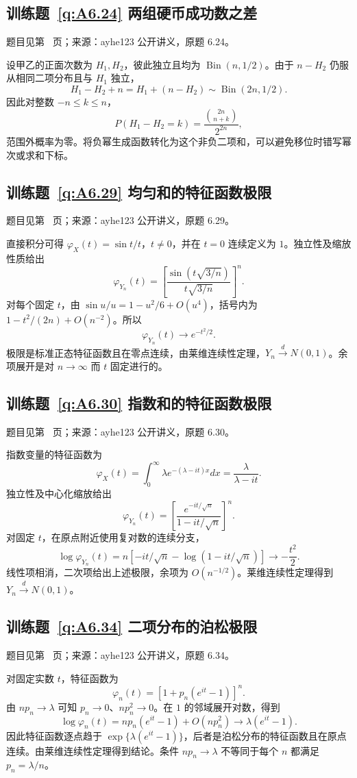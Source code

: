 \documentclass[UTF8,12pt,a4paper,fontset=fandol]{ctexbook}
\begin{document}
\subsection*{训练题~\ref{q:A6.24} 两组硬币成功数之差}\label{a:A6.24}{\small 题目见第~\pageref{q:A6.24} 页；来源：ayhe123 公开讲义，原题 6.24。}
\begin{solve}设甲乙的正面次数为 $H_1,H_2$，彼此独立且均为 $\operatorname{Bin}(n,1/2)$。由于 $n-H_2$ 仍服从相同二项分布且与 $H_1$ 独立，\[H_1-H_2+n=H_1+(n-H_2)\sim\operatorname{Bin}(2n,1/2).\]因此对整数 $-n\le k\le n$，\[P(H_1-H_2=k)=\frac{\binom{2n}{n+k}}{2^{2n}},\]范围外概率为零。将负幂生成函数转化为这个非负二项和，可以避免移位时错写幂次或求和下标。\end{solve}

\subsection*{训练题~\ref{q:A6.29} 均匀和的特征函数极限}\label{a:A6.29}{\small 题目见第~\pageref{q:A6.29} 页；来源：ayhe123 公开讲义，原题 6.29。}
\begin{solve}直接积分可得 $\varphi_X(t)=\sin t/t$，$t\ne0$，并在 $t=0$ 连续定义为 $1$。独立性及缩放性质给出\[\varphi_{Y_n}(t)=\left[\frac{\sin(t\sqrt{3/n})}{t\sqrt{3/n}}\right]^n.\]对每个固定 $t$，由 $\sin u/u=1-u^2/6+O(u^4)$，括号内为 $1-t^2/(2n)+O(n^{-2})$。所以\[\varphi_{Y_n}(t)\to e^{-t^2/2}.\]极限是标准正态特征函数且在零点连续，由莱维连续性定理，$Y_n\xrightarrow dN(0,1)$。余项展开是对 $n\to\infty$ 而 $t$ 固定进行的。\end{solve}

\subsection*{训练题~\ref{q:A6.30} 指数和的特征函数极限}\label{a:A6.30}{\small 题目见第~\pageref{q:A6.30} 页；来源：ayhe123 公开讲义，原题 6.30。}
\begin{solve}指数变量的特征函数为\[\varphi_X(t)=\int_0^\infty\lambda e^{-(\lambda-it)x}dx=\frac{\lambda}{\lambda-it}.\]独立性及中心化缩放给出\[\varphi_{Y_n}(t)=\left[\frac{e^{-it/\sqrt n}}{1-it/\sqrt n}\right]^n.\]对固定 $t$，在原点附近使用复对数的连续分支，\[\log\varphi_{Y_n}(t)=n[-it/\sqrt n-\log(1-it/\sqrt n)]\to-\frac{t^2}2.\]线性项相消，二次项给出上述极限，余项为 $O(n^{-1/2})$。莱维连续性定理得到 $Y_n\xrightarrow dN(0,1)$。\end{solve}

\subsection*{训练题~\ref{q:A6.34} 二项分布的泊松极限}\label{a:A6.34}{\small 题目见第~\pageref{q:A6.34} 页；来源：ayhe123 公开讲义，原题 6.34。}
\begin{solve}对固定实数 $t$，特征函数为\[\varphi_n(t)=[1+p_n(e^{it}-1)]^n.\]由 $np_n\to\lambda$ 可知 $p_n\to0$、$np_n^2\to0$。在 $1$ 的邻域展开对数，得到\[\log\varphi_n(t)=np_n(e^{it}-1)+O(np_n^2)\to\lambda(e^{it}-1).\]因此特征函数逐点趋于 $\exp\{\lambda(e^{it}-1)\}$，后者是泊松分布的特征函数且在原点连续。由莱维连续性定理得到结论。条件 $np_n\to\lambda$ 不等同于每个 $n$ 都满足 $p_n=\lambda/n$。\end{solve}
\end{document}
